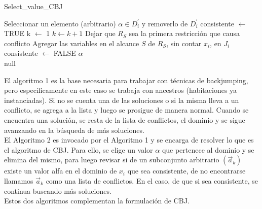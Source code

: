 \documentclass[letter, 10pt]{article}
\begin{document}
\begin{algorithm}[H]
\caption{Select\_value\_CBJ}\label{alg:selectCBJ}
\begin{algorithmic}[1]
        \State Seleccionar un elemento (arbitrario) $\alpha \in D_i^{'}$ y removerlo de $D_i^{'}$
        \State consistente $\gets $ TRUE
        \State k $\gets $ 1
                \State $k \gets k + 1$
            \Else
                \State Dejar que $R_S$ sea la primera restricci\'on que causa conflicto
                \State Agregar las variables en el alcance $S$ de $R_S$, sin contar $x_i$, en $J_i$
                \State consistente $\gets$ FALSE
            \EndIf
        \EndWhile
            \Return $\alpha$
        \EndIf
    \EndWhile \\
    \Return null
\end{algorithmic}
\end{algorithm}

\noindent
El algoritmo 1 es la base necesaria para trabajar con t\'ecnicas de backjumping, pero espec\'ificamente en este caso se trabaja con ancestros (habitaciones ya instanciadas). Si no se cuenta una de las soluciones o si la misma lleva a un conflicto, se agrega a la lista y luego se prosigue de manera normal. Cuando se encuentra una soluci\'on, se resta de la lista de conflictos, el dominio y se sigue avanzando en la b\'usqueda de m\'as soluciones.  \\
El Algoritmo 2 es invocado por el Algoritmo 1 y se encarga de resolver lo que es el algoritmo de CBJ. Para ello,  se elige un valor $\alpha$ que pertenece al dominio y se elimina del mismo, para luego revisar si de un subconjunto arbitrario $(\overrightarrow{a}_k)$ existe un valor alfa en el dominio de $x_i$ que sea consistente, de no encontrarse llamamos $\overrightarrow{a}_k$ como una lista de conflictos. En el caso, de que si sea consistente, se continua buscando m\'as soluciones.\\
Estos dos algoritmos complementan la formulaci\'on de CBJ.

\end{document}
